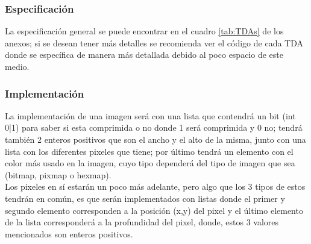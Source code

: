   \subsubsection{Especificación}
    La especificación general se puede encontrar en el cuadro \ref{tab:TDAs} de los anexos;
    si se desean tener más detalles se recomienda ver el código de cada TDA donde se específica
    de manera más detallada debido al poco espacio de este medio.

  \subsubsection{Implementación}
    La implementación de una imagen será con una lista que contendrá un bit (int 0|1) para saber si esta comprimida o no
    donde 1 será comprimida y 0 no; tendrá también 2 enteros positivos que son el ancho y el alto de la misma, junto
    con una lista con los diferentes pixeles que tiene; por último tendrá un elemento con el color más
    usado en la imagen, cuyo tipo dependerá del tipo de imagen que sea (bitmap, pixmap o hexmap).\\

    Los pixeles en sí estarán un poco más adelante, pero algo que los 3 tipos de estos tendrán en común, es que serán implementados con listas 
    donde el primer y segundo elemento corresponden a la posición (x,y) del pixel y el último elemento de la lista
    corresponderá a la profundidad del pixel, donde, estos 3 valores mencionados son enteros positivos.\\

